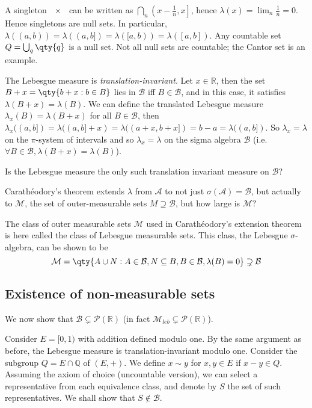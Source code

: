 \begin{remark}
	A singleton $\qty{x}$ can be written as $\bigcap_n \left(x-\frac 1n, x\right]$, hence $\lambda({x}) = \lim_n \frac 1n = 0$.
	Hence singletons are null sets.
	In particular, $\lambda((a,b)) = \lambda((a,b]) = \lambda([a,b)) = \lambda([a,b])$.
	Any countable set $Q = \bigcup_q \qty{q}$ is a null set.
	Not all null sets are countable; the Cantor set is an example.

	The Lebesgue measure is \emph{translation-invariant}.
	Let $x \in \mathbb R$, then the set $B + x = \qty{b + x : b \in B}$ lies in $\mathcal B$ iff $B \in \mathcal B$, and in this case, it satisfies $\lambda(B + x) = \lambda(B)$.
	We can define the translated Lebesgue measure $\lambda_x(B) = \lambda(B + x)$ for all $B \in \mathcal B$, then $\lambda_x((a,b]) = \lambda((a, b] + x) = \lambda((a + x, b+x]) = b - a = \lambda((a, b])$.
	So $\lambda_x = \lambda$ on the $\pi$-system of intervals and so $\lambda_x = \lambda$ on the sigma algebra $\mathcal{B}$ (i.e. $\forall B \in \mathcal{B}, \lambda(B+x) = \lambda(B)$).

	\begin{question}
		Is the Lebesgue measure the only such translation invariant measure on $\mathcal{B}$?
	\end{question}

	Carath\'eodory's theorem extends $\lambda$ from $\mathcal{A}$ to not just $\sigma(\mathcal{A}) = \mathcal{B}$, but actually to $\mathcal{M}$, the set of outer-measurable sets $M \supseteq \mathcal{B}$, but how large is $\mathcal{M}?$

	The class of outer measurable sets $\mathcal M$ used in Carath\'eodory's extension theorem is here called the class of Lebesgue measurable sets.
	This class, the Lebesgue $\sigma$-algebra, can be shown to be
	\[ \mathcal M = \qty{A \cup N : A \in \mathcal B, N \subseteq B, B \in \mathcal B, \lambda(B) = 0 } \supsetneq \mathcal B \]
\end{remark}

\subsection{Existence of non-measurable sets}

We now show that $\mathcal{B} \subsetneq \mathcal{P}(\mathbb{R})$ (in fact $\mathcal{M}_{leb} \subsetneq \mathcal{P}(\mathbb{R})$).

Consider $E = [0,1)$ with addition defined modulo one.
By the same argument as before, the Lebesgue measure is translation-invariant modulo one.
Consider the subgroup $Q = E \cap \mathbb Q$ of $(E, +)$.
We define $x \sim y$ for $x, y \in E$ if $x - y \in Q$.
Assuming the axiom of choice (uncountable version), we can select a representative from each equivalence class, and denote by $S$ the set of such representatives.
We shall show that $S \notin \mathcal{B}$.

